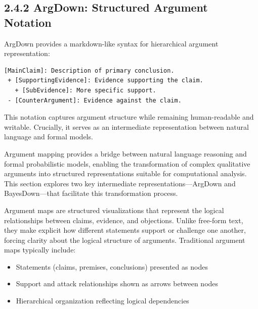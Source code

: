 \documentclass[
  11pt,
  letterpaper,
]{book}
\providecommand{\tightlist}{%
  \setlength{\itemsep}{0pt}\setlength{\parskip}{0pt}}
\begin{document}
\textcite{prokudin2024}

\textcite{scheuer2010}

\textcite{thomas1962}

\textcite{walton2009}

\subsection*{2.4.2 ArgDown: Structured Argument
Notation}\label{sec-argdown-notation}

\textcite{voigt2025}

ArgDown provides a markdown-like syntax for hierarchical argument
representation:

\begin{verbatim}
[MainClaim]: Description of primary conclusion.
 + [SupportingEvidence]: Evidence supporting the claim.
   + [SubEvidence]: More specific support.
 - [CounterArgument]: Evidence against the claim.
\end{verbatim}

This notation captures argument structure while remaining human-readable
and writable. Crucially, it serves as an intermediate representation
between natural language and formal models.

Argument mapping provides a bridge between natural language reasoning
and formal probabilistic models, enabling the transformation of complex
qualitative arguments into structured representations suitable for
computational analysis. This section explores two key intermediate
representations---ArgDown and BayesDown---that facilitate this
transformation process.

Argument maps are structured visualizations that represent the logical
relationships between claims, evidence, and objections. Unlike free-form
text, they make explicit how different statements support or challenge
one another, forcing clarity about the logical structure of arguments.
Traditional argument maps typically include:

\begin{itemize}
\tightlist
\item
  Statements (claims, premises, conclusions) presented as nodes
\item
  Support and attack relationships shown as arrows between nodes
\item
  Hierarchical organization reflecting logical dependencies
\end{itemize}
\end{document}

